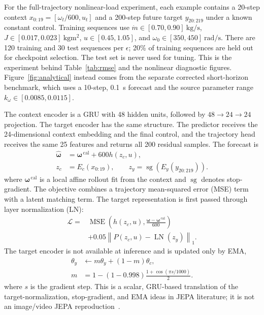 \documentclass[10pt,journal]{IEEEtran}
\begin{document}
For the full-trajectory nonlinear-load experiment, each example contains a 20-step context $x_{0:19}=[\omega_t/600,u_t]$ and a 200-step future target $y_{20:219}$ under a known constant control. Training sequences use $\dot m\in[0.70,0.90]~\si{\kilogram\per\second}$, $J\in[0.017,0.023]~\si{\kilogram\metre\squared}$, $u\in[0.45,1.05]$, and $\omega_0\in[350,450]~\si{\radian\per\second}$. There are 120 training and 30 test sequences per $\epsilon$; 20\% of training sequences are held out for checkpoint selection. The test set is never used for tuning. This is the experiment behind Table~\ref{tab:rmse} and the nonlinear diagnostic figures. Figure~\ref{fig:analytical} instead comes from the separate corrected short-horizon benchmark, which uses a 10-step, 0.1~s forecast and the source parameter range $k_\omega\in[0.0085,0.0115]$.

The context encoder is a GRU with 48 hidden units, followed by $48\rightarrow24\rightarrow24$ projection. The target encoder has the same structure. The predictor receives the 24-dimensional context embedding and the final control, and the trajectory head receives the same 25 features and returns all 200 residual samples. The forecast is
\begin{equation}
  \begin{aligned}
  \hat{\boldsymbol\omega}&=\boldsymbol\omega^{\,\mathrm{cal}}+600h(z_c,u),\\
  z_c&=E_c(x_{0:19}),\qquad z_y=\operatorname{sg}(E_y(y_{20:219})).
  \end{aligned}
 \label{eq:architecture}
\end{equation}
where $\boldsymbol\omega^{\,\mathrm{cal}}$ is a local affine rollout fit from the context and $\operatorname{sg}$ denotes stop-gradient. The objective combines a trajectory mean-squared error (MSE) term with a latent matching term. The target representation is first passed through layer normalization (LN):
\begin{equation}
  \begin{aligned}
  \mathcal{L}={}&\operatorname{MSE}\!\left(h(z_c,u),
  \frac{\boldsymbol\omega-\boldsymbol\omega^{\,\mathrm{cal}}}{600}\right)\\
  &+0.05\left\|P(z_c,u)-\operatorname{LN}(z_y)\right\|_1.
  \end{aligned}
 \label{eq:loss}
\end{equation}
The target encoder is not available at inference and is updated only by EMA,
\begin{equation}
  \begin{aligned}
  \theta_y&\leftarrow m\theta_y+(1-m)\theta_c,\\
  m&=1-(1-0.998)\frac{1+\cos(\pi s/1000)}{2}.
  \end{aligned}
 \label{eq:ema}
\end{equation}
where $s$ is the gradient step. This is a scalar, GRU-based translation of the target-normalization, stop-gradient, and EMA ideas in JEPA literature; it is not an image/video JEPA reproduction~\cite{assran2023ijepa,bardes2024vjepa,assran2025vjepa2}.
\end{document}
